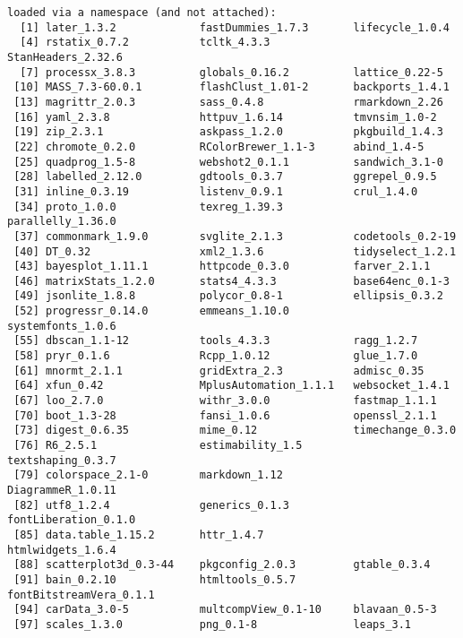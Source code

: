 \documentclass[
  letterpaper,
  DIV=11,
  numbers=noendperiod]{scrartcl}
\begin{document}
\begin{verbatim}
loaded via a namespace (and not attached):
  [1] later_1.3.2             fastDummies_1.7.3       lifecycle_1.0.4        
  [4] rstatix_0.7.2           tcltk_4.3.3             StanHeaders_2.32.6     
  [7] processx_3.8.3          globals_0.16.2          lattice_0.22-5         
 [10] MASS_7.3-60.0.1         flashClust_1.01-2       backports_1.4.1        
 [13] magrittr_2.0.3          sass_0.4.8              rmarkdown_2.26         
 [16] yaml_2.3.8              httpuv_1.6.14           tmvnsim_1.0-2          
 [19] zip_2.3.1               askpass_1.2.0           pkgbuild_1.4.3         
 [22] chromote_0.2.0          RColorBrewer_1.1-3      abind_1.4-5            
 [25] quadprog_1.5-8          webshot2_0.1.1          sandwich_3.1-0         
 [28] labelled_2.12.0         gdtools_0.3.7           ggrepel_0.9.5          
 [31] inline_0.3.19           listenv_0.9.1           crul_1.4.0             
 [34] proto_1.0.0             texreg_1.39.3           parallelly_1.36.0      
 [37] commonmark_1.9.0        svglite_2.1.3           codetools_0.2-19       
 [40] DT_0.32                 xml2_1.3.6              tidyselect_1.2.1       
 [43] bayesplot_1.11.1        httpcode_0.3.0          farver_2.1.1           
 [46] matrixStats_1.2.0       stats4_4.3.3            base64enc_0.1-3        
 [49] jsonlite_1.8.8          polycor_0.8-1           ellipsis_0.3.2         
 [52] progressr_0.14.0        emmeans_1.10.0          systemfonts_1.0.6      
 [55] dbscan_1.1-12           tools_4.3.3             ragg_1.2.7             
 [58] pryr_0.1.6              Rcpp_1.0.12             glue_1.7.0             
 [61] mnormt_2.1.1            gridExtra_2.3           admisc_0.35            
 [64] xfun_0.42               MplusAutomation_1.1.1   websocket_1.4.1        
 [67] loo_2.7.0               withr_3.0.0             fastmap_1.1.1          
 [70] boot_1.3-28             fansi_1.0.6             openssl_2.1.1          
 [73] digest_0.6.35           mime_0.12               timechange_0.3.0       
 [76] R6_2.5.1                estimability_1.5        textshaping_0.3.7      
 [79] colorspace_2.1-0        markdown_1.12           DiagrammeR_1.0.11      
 [82] utf8_1.2.4              generics_0.1.3          fontLiberation_0.1.0   
 [85] data.table_1.15.2       httr_1.4.7              htmlwidgets_1.6.4      
 [88] scatterplot3d_0.3-44    pkgconfig_2.0.3         gtable_0.3.4           
 [91] bain_0.2.10             htmltools_0.5.7         fontBitstreamVera_0.1.1
 [94] carData_3.0-5           multcompView_0.1-10     blavaan_0.5-3          
 [97] scales_1.3.0            png_0.1-8               leaps_3.1              

\end{verbatim}
\end{document}
